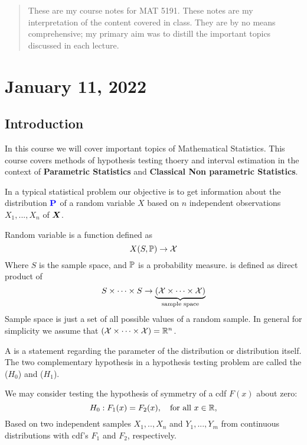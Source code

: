 \begin{abstract}
    These are my course notes for MAT 5191. These notes are my interpretation of the content covered in class. 
    They are by no means comprehensive; my primary aim was to distill the important topics discussed in each lecture. 
\end{abstract}

\section{January 11, 2022}
\subsection{Introduction}
In this course we will cover important topics of Mathematical Statistics. This course covers methods of hypothesis testing thoery and interval estimation in the context of \textbf{Parametric Statistics} and \textbf{Classical Non parametric Statistics}.

In a typical statistical problem our objective is to get information about the distribution $\textbf{\color{blue} P}$ of a random variable $X$ based on $n$ independent observations $X_1,...,X_n$ of $\boldsymbol{X}$. 

\begin{definition}
Random variable is a function defined as
$$
X(S,\mathbb P) \to \mathcal X
$$
Where $S$ is the sample space, and $\mathbb P$ is a probability measure.
 is defined as direct product of 
$$
S \times \cdots \times S \to \underbrace{(\mathcal X \times \cdots \times \mathcal X)}_\text{sample space}
$$
Sample space is just a set of all possible values of a random sample.
In general for simplicity we assume that $(\mathcal X \times \cdots \times \mathcal X) = \mathbb R^n$.

\end{definition}

A  is a statement regarding the parameter of the distribution or distribution itself. The two complementary hypothesis in a hypothesis testing problem are called the  ($H_0$) and  ($H_1$).

\begin{example}
We may consider testing the hypothesis of symmetry of a cdf $F(x)$ about zero:
$$
H_0: F_1(x) = F_2(x), \quad \text{for all } x \in \mathbb R,
$$
Based on two independent samples $X_1,..,X_n$ and $Y_1,...,Y_m$ from continuous distributions with cdf's $F_1$ and $F_2$, respectively.
\end{example}

